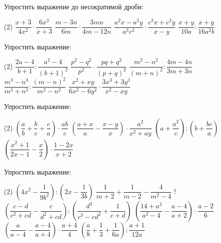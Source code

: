 \begin{class}[number=6]
	\begin{listofex}
	\item Упростить выражение до несократимой дроби:
	\begin{tasks}(2)
		\task \( \dfrac{x+3}{4x^2}\cdot\dfrac{6x^3}{x+3} \)
		\task \( \dfrac{m-3n}{6m}\cdot\dfrac{3mn}{4m-12n} \)
		\task \( \dfrac{a^2x-a^2y}{a^3c^3}\cdot\dfrac{c^3x+c^3y}{x-y} \)
		\task \( \dfrac{x+y}{10a}:\dfrac{x+y}{16a^2b} \)
	\end{tasks}
	\item Упростить выражение:
	\begin{tasks}(2)
		\task \( \dfrac{2a-4}{b+1}:\dfrac{a^2-4}{(b+1)^2} \)
		\task \( \dfrac{p^2-q^2}{p^2}\cdot\dfrac{pq+q^2}{(p+q)^2} \)
		\task \( \dfrac{m^2-n^2}{(m+n)^2}:\dfrac{4m-4n}{3m+3n} \)
		\task \( \dfrac{m^3-n^3}{m^3+n^3}:\dfrac{(m-n)^2}{m^2-n^2} \)
		\task \( \dfrac{x^2+xy}{6x^2-6y^2}\cdot\dfrac{3x^3+3y^3}{x^2-xy} \)
	\end{tasks}
	\item Упростить выражение:
	\begin{tasks}(2)
		\task \( \left( \dfrac{a}{b}+\dfrac{b}{c}+\dfrac{c}{a} \right)\cdot\dfrac{ab}{c} \)
		\task \( \left( \dfrac{a+x}{a}-\dfrac{x-y}{x} \right)\cdot\dfrac{a^2}{x^2+ay} \)
		\task \( \left( a+\dfrac{a^2}{c} \right):\left( b+\dfrac{bc}{a} \right) \)
		\task \( \left( \dfrac{x^2+1}{2x-1}-\dfrac{x}{2} \right)\cdot\dfrac{1-2x}{x+2} \)
	\end{tasks}
	\item Упростить выражение:
	\begin{tasks}(2)
		\task \( \left( 4x^2-\dfrac{1}{9b^2} \right):\left( 2x-\dfrac{1}{3b} \right) \)
		\task \( \dfrac{1}{m+2}+\dfrac{1}{m-2}-\dfrac{4}{m^2-4} \)
		\task! \( \left( \dfrac{c-d}{c^2+cd}-\dfrac{c}{d^2+cd} \right):\left( \dfrac{d^2}{c^3-cd^2}+\dfrac{1}{c+d} \right) \)
		\task \( \left( \dfrac{14+a^2}{a^2-4}-\dfrac{a-4}{a+2} \right)\cdot\dfrac{a-2}{6} \)
		\task \( \left( \dfrac{a}{a-4}-\dfrac{a-4}{a+4} \right)\cdot\dfrac{a+4}{4} \)
		\task \( \left( \dfrac{a}{8}+\dfrac{1}{3}+\dfrac{1}{6a} \right):\dfrac{a+1}{12a} \)
	\end{tasks}
	\end{listofex}
\end{class}

